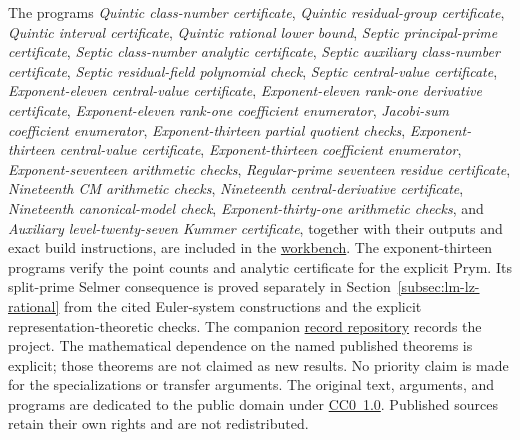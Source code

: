 \documentclass[11pt]{article}
\newcommand{\workbenchurl}{https://github.com/KokunoYumeto/k-theory-and-galois-groups-workbench}
\newcommand{\recordurl}{https://github.com/KokunoYumeto/mathematics-workbenches}
\theoremstyle{definition}
\begin{document}
The programs \emph{Quintic class-number certificate},
\emph{Quintic residual-group certificate},
\emph{Quintic interval certificate},
\emph{Quintic rational lower bound},
\emph{Septic principal-prime certificate}, \emph{Septic class-number analytic certificate}, \emph{Septic auxiliary class-number certificate}, \emph{Septic residual-field polynomial check},
\emph{Septic central-value certificate},
\emph{Exponent-eleven central-value certificate},
\emph{Exponent-eleven rank-one derivative certificate},
\emph{Exponent-eleven rank-one coefficient enumerator},
\emph{Jacobi-sum coefficient enumerator},
\emph{Exponent-thirteen partial quotient checks},
\emph{Exponent-thirteen central-value certificate},
\emph{Exponent-thirteen coefficient enumerator},
\emph{Exponent-seventeen arithmetic checks},
\emph{Regular-prime seventeen residue certificate},
\emph{Nineteenth CM arithmetic checks},
\emph{Nineteenth central-derivative certificate},
\emph{Nineteenth canonical-model check},
\emph{Exponent-thirty-one arithmetic checks}, and
\emph{Auxiliary level-twenty-seven Kummer certificate}, together with their
outputs and exact build instructions, are included in the
\href{\workbenchurl}{workbench}. The exponent-thirteen programs verify
the point counts and analytic certificate for the explicit Prym.
Its split-prime Selmer consequence is proved separately in
Section~\ref{subsec:lm-lz-rational} from the cited Euler-system
constructions and the explicit representation-theoretic checks.
The companion \href{\recordurl}{record repository} records the project.
The mathematical dependence on the named published theorems is
explicit; those theorems are not claimed as new results. No priority
claim is made for the specializations or transfer arguments.
The original text, arguments, and programs are dedicated to the public
domain under
\href{https://creativecommons.org/publicdomain/zero/1.0/}{CC0~1.0}.
Published sources retain their own rights and are not redistributed.




\end{document}
